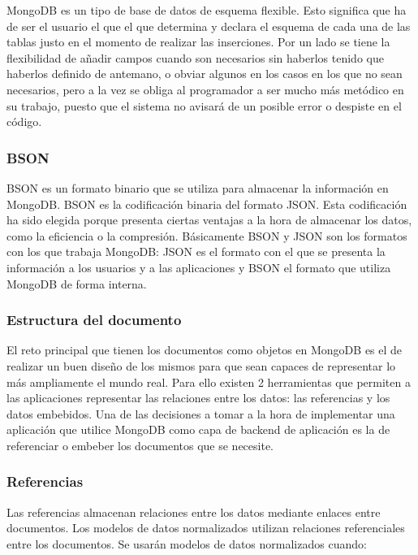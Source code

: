 \documentclass[preprint,12pt]{elsarticle}
\begin{document}
MongoDB es un tipo de base de datos de esquema flexible. Esto significa que ha de ser el usuario el que el que determina y declara el esquema de cada una de las tablas justo en el momento de realizar las inserciones.
Por un lado se tiene la flexibilidad de añadir campos cuando son necesarios sin haberlos tenido que haberlos definido de antemano, o obviar algunos en los casos en los que no sean necesarios, pero a la vez se obliga al programador a ser mucho más metódico en su trabajo, puesto que el sistema no avisará de un posible error o despiste en el código.

\subsubsection{\textbf{BSON}}

BSON es un formato binario que se utiliza para almacenar la información en MongoDB. BSON es la codificación binaria del formato JSON. Esta codificación ha sido elegida porque presenta ciertas ventajas a la hora de almacenar los datos, como la eficiencia o la compresión.
Básicamente BSON y JSON son los formatos con los que trabaja MongoDB: JSON es el formato con el que se presenta la información a los usuarios y a las aplicaciones y BSON el formato que utiliza MongoDB de forma interna.

\subsubsection{\textbf{Estructura del documento}}

El reto principal que tienen los documentos como objetos en MongoDB es el de realizar un buen diseño de los mismos para que sean capaces de representar lo más ampliamente el mundo real. Para ello existen 2 herramientas que permiten a las aplicaciones representar las relaciones entre los datos: las referencias y los datos embebidos. Una de las decisiones a tomar a la hora de implementar una aplicación que utilice MongoDB como capa de backend de aplicación es la de referenciar o embeber los documentos que se necesite.

\subsubsection{\textbf{Referencias}}
Las referencias almacenan relaciones entre los datos mediante enlaces entre documentos.
Los modelos de datos normalizados utilizan relaciones referenciales entre los documentos. Se usarán modelos de datos normalizados cuando:
\end{document}

